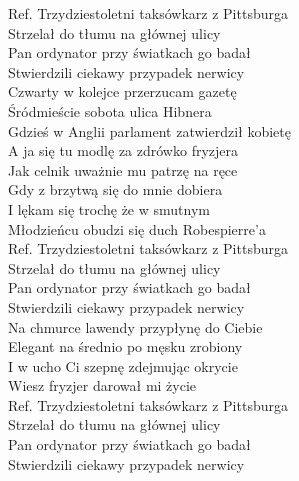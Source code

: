 
\begin{flushleft}
Ref. Trzydziestoletni taksówkarz z Pittsburga \tab{} \\
\hspace{0.9cm}Strzelał do tłumu na głównej ulicy \tab{} \\
\hspace{0.9cm}Pan ordynator przy światkach go badał \tab{}\\
\hspace{0.9cm}Stwierdzili ciekawy przypadek nerwicy \tab{}\\
\vskip 3mm
Czwarty w kolejce przerzucam gazetę \tab{}\\
Śródmieście sobota ulica Hibnera \tab{}\\
Gdzieś w Anglii parlament zatwierdził kobietę \tab{}\\
A ja się tu modlę za zdrówko fryzjera \tab{} \\
Jak celnik uważnie mu patrzę na ręce \tab{} \\
Gdy z brzytwą się do mnie dobiera \tab{} \\
I lękam się trochę że w smutnym \tab{} \\
Młodzieńcu obudzi się duch Robespierre'a \tab{} \\
\vskip 3mm
Ref. Trzydziestoletni taksówkarz z Pittsburga  \\
\hspace{0.9cm}Strzelał do tłumu na głównej ulicy  \\
\hspace{0.9cm}Pan ordynator przy światkach go badał \\
\hspace{0.9cm}Stwierdzili ciekawy przypadek nerwicy \\
\vskip 3mm
Na chmurce lawendy przypłynę do Ciebie \\
Elegant na średnio po męsku zrobiony \\
I w ucho Ci szepnę zdejmując okrycie\\
Wiesz fryzjer darował mi życie\\
\vskip 3mm
Ref. Trzydziestoletni taksówkarz z Pittsburga  \\
\hspace{0.9cm}Strzelał do tłumu na głównej ulicy  \\
\hspace{0.9cm}Pan ordynator przy światkach go badał \\
\hspace{0.9cm}Stwierdzili ciekawy przypadek nerwicy \\
\vskip 3mm
\end{flushleft}
\clearpage

